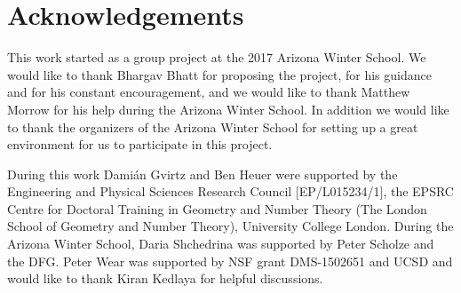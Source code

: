 \documentclass[10pt,oneside]{amsart}
\theoremstyle{definition}
\newtheorem{question}[mainthm]{Question}
\newtheorem*{example}{Example}
\begin{document}
 \begin{comment}
Now we end the introduction by describing the content of each section. 

	\begin{question} \label{question_intro}
	    \begin{enumerate} 
	    \item		Given a rigid group $G$, when is there an adic space $G_\infty$ such that $G_\infty \sim  \varprojlim_{[p]} G ?$
	    \item If it exists, and $K$ is perfectoid, when is $G_\infty$ perfectoid?
	    \end{enumerate}
	\end{question}
 
 
	But before we give proofs for examples of rigid groups $G$ for which a perfectoid tilde-limit exists, we first note that the second question certainly doesn't have an affirmative answer for all rigid group varieties:
	\begin{example}
		For the additive group $\mathbb G_a^{\operatorname{an}}$, we know that $[p]$ is an isomorphism and therefore $\varprojlim_{[p]} \mathbb G_a=\mathbb G_a$ exists (even as an actual limit in the category of adic spaces) but is certainly not perfectoid.
	\end{example}

\end{comment} 
 
 
 
 \section*{Acknowledgements}
 This work started as a group project at the 2017 Arizona Winter School. We would like to thank Bhargav Bhatt for proposing the project, for his guidance and for his constant encouragement, and we would like to thank Matthew Morrow for his help during the Arizona Winter School. In addition we would like to thank the organizers of the Arizona Winter School for setting up a great environment for us to participate in this project. 
 
 During this work Dami\'an Gvirtz and Ben Heuer were supported by the Engineering and Physical Sciences Research Council [EP/L015234/1], the EPSRC Centre for Doctoral Training in Geometry and Number Theory (The London School of Geometry and Number Theory), University College London. 
 During the Arizona Winter School, Daria Shchedrina was supported by Peter Scholze and the DFG.
 Peter Wear was supported by NSF grant DMS-1502651 and UCSD and would like to thank Kiran Kedlaya for helpful discussions.
\end{document}
